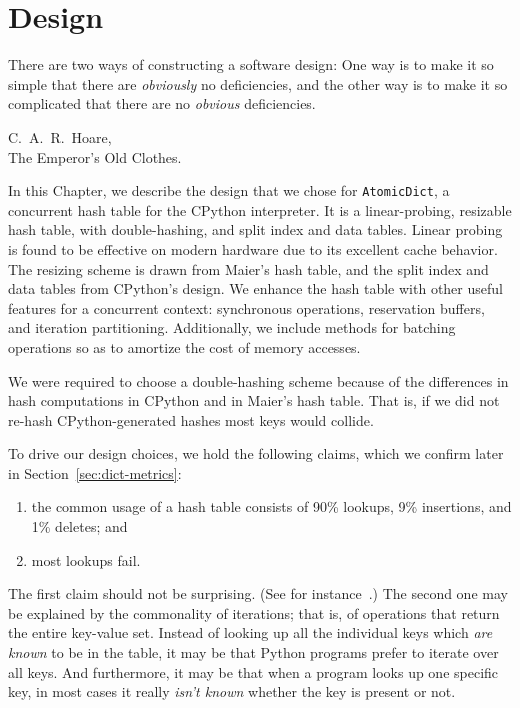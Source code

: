 \chapter{Design}\label{ch:design}


\epigraph{
    There are two ways of constructing a software design: One way is to make it so simple that there are \emph{obviously} no deficiencies, and the other way is to make it so complicated that there are no \emph{obvious} deficiencies.
}{C.\ A.\ R.\ Hoare,\\The Emperor's Old Clothes.}


In this Chapter, we describe the design that we chose for \texttt{AtomicDict}, a concurrent hash table for the CPython interpreter.
It is a linear-probing, resizable hash table, with double-hashing, and split index and data tables.
Linear probing is found to be effective on modern hardware due to its excellent cache behavior.
The resizing scheme is drawn from Maier's hash table, and the split index and data tables from CPython's design.
We enhance the hash table with other useful features for a concurrent context: synchronous operations, reservation buffers, and iteration partitioning.
Additionally, we include methods for batching operations so as to amortize the cost of memory accesses.

We were required to choose a double-hashing scheme because of the differences in hash computations in CPython and in Maier's hash table.
That is, if we did not re-hash CPython-generated hashes most keys would collide.

To drive our design choices, we hold the following claims, which we confirm later in Section~\ref{sec:dict-metrics}:
\begin{enumerate}
    \item the common usage of a hash table consists of 90\% lookups, 9\% insertions, and 1\% deletes; and
    \item most lookups fail.
\end{enumerate}

The first claim should not be surprising.
(See for instance~\cite[\S13.1]{art-mp}.)
The second one may be explained by the commonality of iterations; that is, of operations that return the entire key-value set.
Instead of looking up all the individual keys which \emph{are known} to be in the table, it may be that Python programs prefer to iterate over all keys.
And furthermore, it may be that when a program looks up one specific key, in most cases it really \emph{isn't known} whether the key is present or not.

